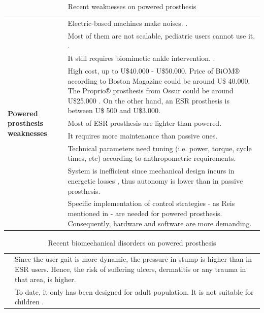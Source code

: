 \documentclass[12pt,english]{article}
\providecommand{\tabularnewline}{\\}
\begin{document}
\begin{center}
\begin{table}[H]


\caption{\label{tab:Debilidades-pr=0000F3tesis-activas} Recent weaknesses on powered prosthesis}


\begin{tabular}{|l|>{\centering}p{15cm}|}
\hline 
\multirow{9}{*}[-10mm]{\begin{turn}{90}
\textbf{Powered prosthesis weaknesses}
\end{turn}} & \centering{} Electric-based machines make noises. \cite{boston}.\tabularnewline
\cline{2-2} 
 & \centering{} Most of them are not scalable, pediatric users cannot use it. \cite{BIOMASME}.\tabularnewline
\cline{2-2} 
 & It still requires biomimetic ankle intervention. \cite{Hill2013a}.\tabularnewline
\cline{2-2} 
 & High cost, up to U\$40.000 - U\$50.000. Price of BiOM® according to Boston Magazine\cite{boston} could be around U\$ 40.000. The Proprio® prosthesis from Ossur could be around U\$25.000 \cite{bloomberg}. On the other hand, an ESR prosthesis is between U\$ 500 and U\$3.000.\tabularnewline
\cline{2-2} 
 & Most of ESR prosthesis are lighter than powered.\tabularnewline
\cline{2-2} 
 & It requires more maintenance than passive ones.\tabularnewline
\cline{2-2} 
 & Technical parameters need tuning (i.e. power, torque, cycle times, etc) according to anthropometric requirements. \tabularnewline
\cline{2-2} 
 & System is inefficient since mechanical design incurs in energetic losses \cite{boston, Cherelle2014a}, thus autonomy is lower than in passive prosthesis.\tabularnewline
\cline{2-2} 
 & Specific implementation of control strategies - as Reis mentioned in \cite{Reis2016} - are needed for powered prosthesis. Consequently, hardware and software are more demanding. \tabularnewline
\hline 
\end{tabular}

\end{table}

\par\end{center}

\begin{center}
\begin{table}
\caption{\label{tab:Alteraciones-biomec=0000E1nicas-activas}Recent biomechanical disorders on powered prosthesis}


\centering{}%
\begin{tabular}[b]{|>{\raggedright}p{3cm}|>{\centering}p{125mm}|}
\hline 
\multirow{2}{3cm}{\textbf{Biomechanical disorders}} & Since the user gait is more dynamic, the pressure in stump is higher than in ESR users. Hence, the risk of suffering ulcers, dermatitis or any trauma in that area, is higher. \cite{Wolf2009}\tabularnewline
\cline{2-2} 
 & To date, it only has been designed for adult population. It is not suitable for children \cite{BIOMASME}.\tabularnewline
\hline 
\end{tabular}
\end{table}

\par\end{center}
\end{document}
